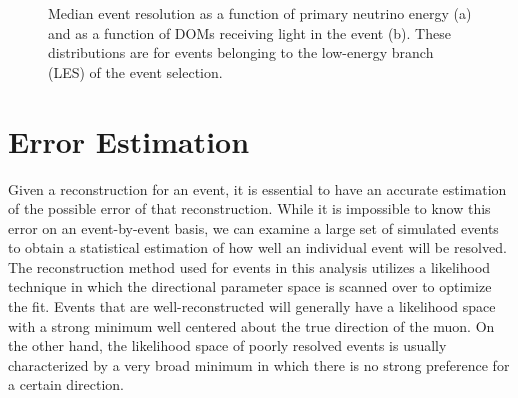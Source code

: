 \documentclass{gatech-thesis}
\begin{document}
\begin{figure}\label{fig:EventRes}
\centering
{}
\caption{Median event resolution as a function of primary neutrino energy (a) and as a function of DOMs receiving light in the event (b). These distributions are for events belonging to the low-energy branch (LES) of the event selection.} 
\end{figure}

\section{Error Estimation}
Given a reconstruction for an event, it is essential to have an accurate estimation of the possible error of that reconstruction. While it is impossible to know this error on an event-by-event basis, we can examine a large set of simulated events to obtain a statistical estimation of how well an individual event will be resolved. The reconstruction method used for events in this analysis utilizes a likelihood technique in which the directional parameter space is scanned over to optimize the fit. Events that are well-reconstructed will generally have a likelihood space with a strong minimum well centered about the true direction of the muon. On the other hand, the likelihood space of poorly resolved events is usually characterized by a very broad minimum in which there is no strong preference for a certain direction.
\end{document}
